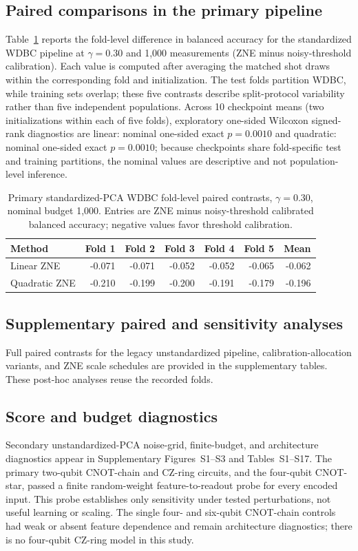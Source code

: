 \documentclass[conference]{IEEEtran}
\begin{document}
\subsection{Paired comparisons in the primary pipeline}
Table~\ref{tab:primary-paired} reports the fold-level difference in balanced accuracy for the standardized WDBC pipeline at $\gamma=0.30$ and 1,000 measurements (ZNE minus noisy-threshold calibration). Each value is computed after averaging the matched shot draws within the corresponding fold and initialization. The test folds partition WDBC, while training sets overlap; these five contrasts describe split-protocol variability rather than five independent populations. Across 10 checkpoint means (two initializations within each of five folds), exploratory one-sided Wilcoxon signed-rank diagnostics are linear: nominal one-sided exact $p=0.0010$ and quadratic: nominal one-sided exact $p=0.0010$; because checkpoints share fold-specific test and training partitions, the nominal values are descriptive and not population-level inference.
\begin{table}[t]\centering\small
\caption{Primary standardized-PCA WDBC fold-level paired contrasts, $\gamma=0.30$, nominal budget 1,000. Entries are ZNE minus noisy-threshold calibrated balanced accuracy; negative values favor threshold calibration.}
\label{tab:primary-paired}
\begin{tabular}{@{}l r r r r r r@{}}\toprule
Method & Fold 1 & Fold 2 & Fold 3 & Fold 4 & Fold 5 & Mean \\
\midrule
Linear ZNE & -0.071 & -0.071 & -0.052 & -0.052 & -0.065 & -0.062 \\
Quadratic ZNE & -0.210 & -0.199 & -0.200 & -0.191 & -0.179 & -0.196 \\
\bottomrule\end{tabular}\end{table}
\subsection{Supplementary paired and sensitivity analyses}
Full paired contrasts for the legacy unstandardized pipeline, calibration-allocation variants, and ZNE scale schedules are provided in the supplementary tables. These post-hoc analyses reuse the recorded folds.

\subsection{Score and budget diagnostics}
Secondary unstandardized-PCA noise-grid, finite-budget, and architecture diagnostics appear in Supplementary Figures~S1--S3 and Tables~S1--S17. The primary two-qubit CNOT-chain and CZ-ring circuits, and the four-qubit CNOT-star, passed a finite random-weight feature-to-readout probe for every encoded input. This probe establishes only sensitivity under tested perturbations, not useful learning or scaling. The single four- and six-qubit CNOT-chain controls had weak or absent feature dependence and remain architecture diagnostics; there is no four-qubit CZ-ring model in this study.
\end{document}
